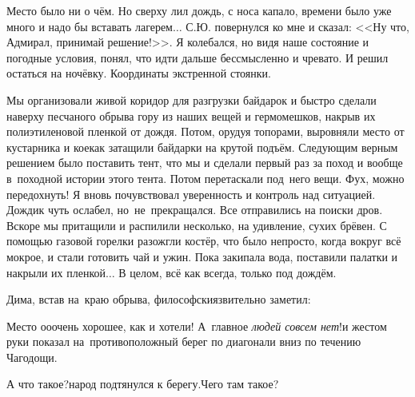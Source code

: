 Место было ни о чём. Но сверху лил дождь, с носа капало, времени было уже много и надо бы вставать лагерем$\ldots$ С.Ю. повернулся ко мне и сказал: <<Ну что, Адмирал, принимай решение!>>. Я колебался, но видя наше состояние и погодные условия, понял, что идти дальше бессмысленно и чревато. И решил остаться на ночёвку. Координаты экстренной стоянки\mdash \CoordsChagodoschaSixteenEmergencyNignt.

Мы организовали живой коридор для разгрузки байдарок и быстро сделали наверху песчаного обрыва гору из наших вещей и гермомешков, накрыв их полиэтиленовой пленкой от дождя. Потом, орудуя топорами, выровняли место от кустарника и кое\sdash как затащили байдарки на крутой подъём. Следующим верным решением было поставить тент, что мы и сделали первый раз за поход и вообще в~походной истории этого тента. Потом перетаскали под~него вещи. Фух, можно передохнуть! Я вновь почувствовал уверенность и контроль над ситуацией. Дождик чуть ослабел, но~не~прекращался. Все отправились на поиски дров. Вскоре мы притащили и распилили несколько, на удивление, сухих брёвен. С помощью газовой горелки разожгли костёр, что было непросто, когда вокруг всё мокрое, и стали готовить чай и ужин. Пока закипала вода, поставили палатки и накрыли их пленкой$\ldots$ В целом, всё как всегда, только под дождём. 


Дима, встав на~краю обрыва, философски\sdash язвительно заметил: 

\diagdash Место о\sdash о\sdash очень хорошее, как и хотели! А~главное \textit{людей совсем нет}!\mdash и жестом руки показал на~противоположный берег по диагонали вниз по течению Чагодощи. 

\diagdash А что такое?\mdash народ подтянулся к берегу.\mdash Чего там такое?

